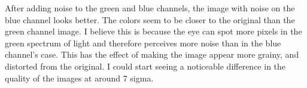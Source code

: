 After adding noise to the green and blue channels, the image with noise on the blue channel looks better. The colors seem to be closer to the original than the green channel image. I believe this is because the eye can spot more pixels in the green spectrum of light and therefore perceives more noise than in the blue channel's case. This has the effect of making the image appear more grainy, and distorted from the original. I could start seeing a noticeable difference in the quality of the images at around 7 sigma.